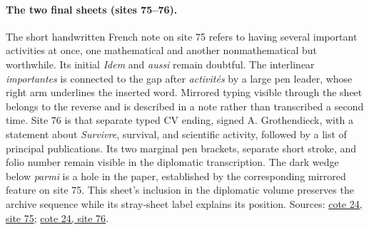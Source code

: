 \paragraph{The two final sheets (sites 75--76).}
The short handwritten French note on site 75 refers to having several important activities at once, one mathematical and another nonmathematical but worthwhile. Its initial \emph{Idem} and \emph{aussi} remain doubtful. The interlinear \emph{importantes} is connected to the gap after \emph{activités} by a large pen leader, whose right arm underlines the inserted word. Mirrored typing visible through the sheet belongs to the reverse and is described in a note rather than transcribed a second time. Site 76 is that separate typed CV ending, signed A. Grothendieck, with a statement about \emph{Survivre}, survival, and scientific activity, followed by a list of principal publications. Its two marginal pen brackets, separate short stroke, and folio number remain visible in the diplomatic transcription. The dark wedge below \emph{parmi} is a hole in the paper, established by the corresponding mirrored feature on site 75. This sheet's inclusion in the diplomatic volume preserves the archive sequence while its stray-sheet label explains its position. Sources: \href{https://grothendieck.umontpellier.fr/web/viewer.html?file=../24.pdf\#page=76}{cote 24, site 75}; \href{https://grothendieck.umontpellier.fr/web/viewer.html?file=../24.pdf\#page=77}{cote 24, site 76}.
